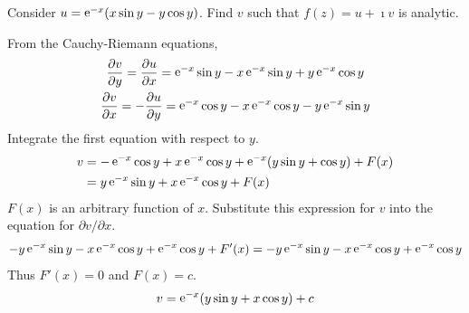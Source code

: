 \begin{Example}
  Consider $u = \mathop{\mathrm{e}}\nolimits^{-x} (x \sin y - y \cos y)$.
  Find $v$ such that $f(z) = u + \imath v$ is analytic.

  From the Cauchy-Riemann equations,
  \begin{gather*}
    \frac{\partial v}{\partial y} = \frac{\partial u}{\partial x} =
    \mathop{\mathrm{e}}\nolimits^{-x} \sin y - x \mathop{\mathrm{e}}\nolimits^{-x} \sin y + y \mathop{\mathrm{e}}\nolimits^{-x} \cos y
    \\
    \frac{\partial v}{\partial x} = -\frac{\partial u}{\partial y} =
    \mathop{\mathrm{e}}\nolimits^{-x} \cos y - x \mathop{\mathrm{e}}\nolimits^{-x} \cos y - y \mathop{\mathrm{e}}\nolimits^{-x} \sin y
  \end{gather*}
  Integrate the first equation with respect to $y$.
  \begin{align*}
    v &= -\mathop{\mathrm{e}}\nolimits^{-x} \cos y + x \mathop{\mathrm{e}}\nolimits^{-x} \cos y + \mathop{\mathrm{e}}\nolimits^{-x} (y \sin y + \cos y) + F(x) 
    \\
    &= y \mathop{\mathrm{e}}\nolimits^{-x} \sin y + x \mathop{\mathrm{e}}\nolimits^{-x} \cos y + F(x)
  \end{align*}
  $F(x)$ is an arbitrary function of $x$.
  Substitute this expression for $v$ into the equation for
  $\partial v/ \partial x$.
  \[
  -y \mathop{\mathrm{e}}\nolimits^{-x} \sin y - x \mathop{\mathrm{e}}\nolimits^{-x} \cos y + \mathop{\mathrm{e}}\nolimits^{-x} \cos y + F'(x) =
  -y \mathop{\mathrm{e}}\nolimits^{-x} \sin y - x \mathop{\mathrm{e}}\nolimits^{-x} \cos y + \mathop{\mathrm{e}}\nolimits^{-x} \cos y
  \]
  Thus $F'(x) = 0$ and $F(x) = c$.
  \[
  v = \mathop{\mathrm{e}}\nolimits^{-x} (y \sin y + x \cos y) + c
  \]
\end{Example}










